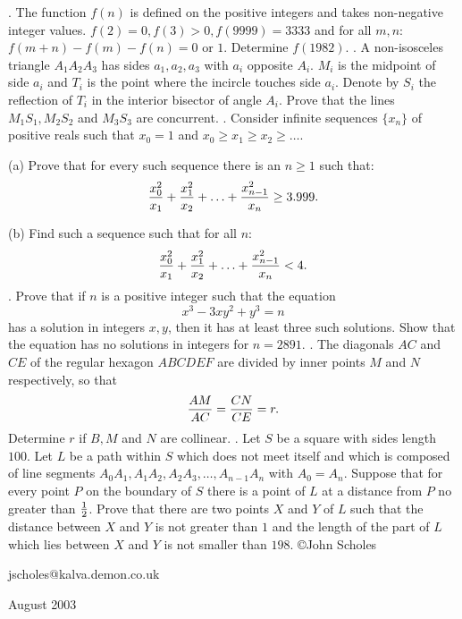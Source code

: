 \nopagenumbers
{}
\vskip 25pt
. The function $f(n)$ is defined on the positive integers and takes non-negative integer values. $f(2)=0,f(3)>0,f(9999)=3333$ and for all $m,n$: $f(m+n)-f(m)-f(n)=0$ or $1$. Determine $f(1982)$.
\vskip 12pt
. A non-isosceles triangle $A_1A_2A_3$ has sides $a_1,a_2,a_3$ with $a_i$ opposite $A_i$. $M_i$ is the midpoint of side $a_i$ and $T_i$ is the point where the incircle touches side $a_i$. Denote by $S_i$ the reflection of $T_i$ in the interior bisector of angle $A_i$. Prove that the lines $M_1S_1,M_2S_2$ and $M_3S_3$ are concurrent.
\vskip 12pt
. Consider infinite sequences $\{x_n\}$ of positive reals such that $x_0=1$ and $x_0\ge x_1\ge x_2\ge\ldots$.

(a) Prove that for every such sequence there is an $n\ge1$ such that: $${x_0^2\over x_1}+{x_1^2\over x_2}+\ldots+{x_{n-1}^2\over x_n}\ge3.999.$$

(b) Find such a sequence such that for all $n$: $${x_0^2\over x_1}+{x_1^2\over x_2}+\ldots+{x_{n-1}^2\over x_n}<4.$$
\vskip 12pt
. Prove that if $n$ is a positive integer such that the equation $$x^3-3xy^2+y^3=n$$
has a solution in integers $x,y$, then it has at least three such solutions. Show that the equation has no solutions in integers for $n=2891$.
\vskip 12pt
. The diagonals $AC$ and $CE$ of the regular hexagon $ABCDEF$ are divided by inner points $M$ and $N$ respectively, so that $${AM\over AC}={CN\over CE}=r.$$ Determine $r$ if $B,M$ and $N$ are collinear.
\vskip 12pt
. Let $S$ be a square with sides length $100$. Let $L$ be a path within $S$ which does not meet itself and which is composed of line segments $A_0A_1,A_1A_2,A_2A_3,\ldots,A_{n-1}A_n$ with $A_0=A_n$. Suppose that for every point $P$ on the boundary of $S$ there is a point of $L$ at a distance from $P$ no greater than $1\over2$. Prove that there are two points $X$ and $Y$ of $L$ such that the distance between $X$ and $Y$ is not greater than $1$ and the length of the part of $L$ which lies between $X$ and $Y$ is not smaller than $198$.
\vskip 20pt
\noindent \copyright John Scholes

\noindent jscholes@kalva.demon.co.uk

 August 2003

\bye
